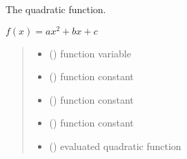 \documentclass[letterpaper,10pt,english]{sphinxmanual}
\begin{document}
\begin{fulllineitems}
\label{\detokenize{01_utils:skinoptics.utils.quadratic}}
\pysigstartsignatures
{}
\pysigstopsignatures
\sphinxAtStartPar
The quadratic function.

\sphinxAtStartPar
\(f(x) = ax^2 + bx + c\)
\begin{quote}\begin{description}
\begin{itemize}
\item {} 
\sphinxAtStartPar
{} () \textendash{} function variable

\item {} 
\sphinxAtStartPar
{} () \textendash{} function constant

\item {} 
\sphinxAtStartPar
{} () \textendash{} function constant

\item {} 
\sphinxAtStartPar
{} () \textendash{} function constant

\end{itemize}

\sphinxAtStartPar
\begin{itemize}
\item {} 
\sphinxAtStartPar
{} () \textendash{} evaluated quadratic function

\end{itemize}


\end{description}\end{quote}

\end{fulllineitems}

\end{document}
